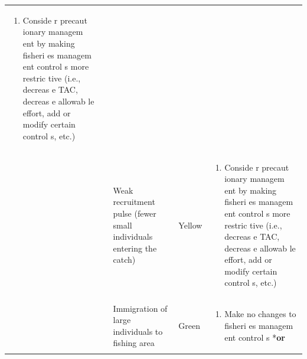 \documentclass[]{book}
\providecommand{\tightlist}{%
  \setlength{\itemsep}{0pt}\setlength{\parskip}{0pt}}
\begin{document}
\begin{longtable}[]{@{}lllll@{}}
\begin{minipage}[t]{0.19\columnwidth}
\begin{enumerate}
\def\labelenumi{\arabic{enumi}.}
\setcounter{enumi}{1}
\tightlist
\item
  Conside r precaut ionary managem ent by making fisheri es managem ent
  control s more restric tive (i.e., decreas e TAC, decreas e allowab le
  effort, add or modify certain control s, etc.)
\end{enumerate}\strut
\end{minipage}\tabularnewline
\begin{minipage}[t]{0.19\columnwidth}\raggedright\strut
\strut
\end{minipage} & \begin{minipage}[t]{0.19\columnwidth}\raggedright\strut
\strut
\end{minipage} & \begin{minipage}[t]{0.19\columnwidth}\raggedright\strut
Weak recruitment pulse (fewer small individuals entering the
catch)\strut
\end{minipage} & \begin{minipage}[t]{0.19\columnwidth}\raggedright\strut
Yellow\strut
\end{minipage} & \begin{minipage}[t]{0.19\columnwidth}\raggedright\strut
\begin{enumerate}
\def\labelenumi{\arabic{enumi}.}
\tightlist
\item
  Conside r precaut ionary managem ent by making fisheri es managem ent
  control s more restric tive (i.e., decreas e TAC, decreas e allowab le
  effort, add or modify certain control s, etc.)
\end{enumerate}\strut
\end{minipage}\tabularnewline
\begin{minipage}[t]{0.19\columnwidth}\raggedright\strut
\strut
\end{minipage} & \begin{minipage}[t]{0.19\columnwidth}\raggedright\strut
\strut
\end{minipage} & \begin{minipage}[t]{0.19\columnwidth}\raggedright\strut
Immigration of large individuals to fishing area\strut
\end{minipage} & \begin{minipage}[t]{0.19\columnwidth}\raggedright\strut
Green\strut
\end{minipage} & \begin{minipage}[t]{0.19\columnwidth}\raggedright\strut
\begin{enumerate}
\def\labelenumi{\arabic{enumi}.}
\tightlist
\item
  Make no changes to fisheri es managem ent control s *\textbf{or}
\end{enumerate}


\end{minipage}
\end{longtable}
\end{document}
